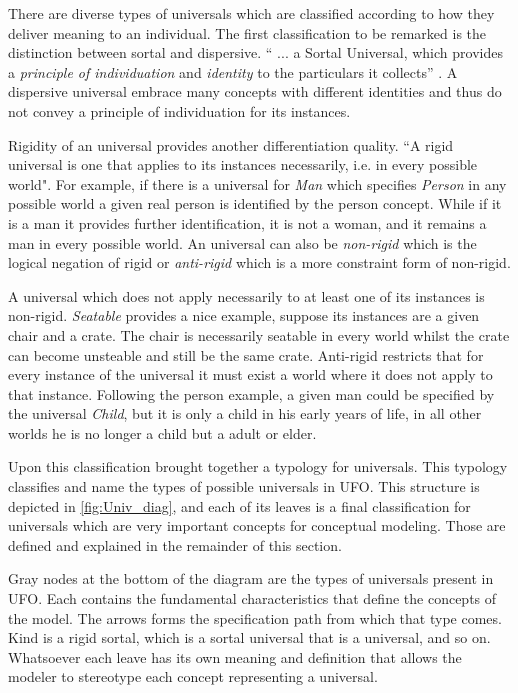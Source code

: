 There are diverse types of universals which are classified according to how they deliver meaning to an individual. The first classification to be remarked is the distinction between sortal and dispersive. `` ... a Sortal Universal, which provides a \textit{principle of individuation} and \textit{identity} to the particulars it collects'' \citep{guizzardi_ontological_2005}. A dispersive universal embrace many concepts with different identities and thus do not convey a principle of individuation for its instances.

Rigidity of an universal provides another differentiation quality. ``A rigid universal is one that applies to its instances necessarily, i.e. in every possible world"\citep{guizzardi_ontological_2005}. For example, if there is a universal for \textit{Man} which specifies \textit{Person} in any possible world a given real person is identified by the person concept. While if it is a man it provides further identification, it is not a woman, and it remains a man in every possible world. An universal can also be \textit{non-rigid} which is the logical negation of rigid or \textit{anti-rigid} which is a more constraint form of non-rigid.

A universal which does not apply necessarily to at least one of its instances is non-rigid. \textit{Seatable} provides a nice example, suppose its instances are a given chair and a crate. The chair is necessarily seatable in every world whilst the crate can become unsteable and still be the same crate. Anti-rigid restricts that for every instance of the universal it must exist a world where it does not apply to that instance. Following the person example, a given man could be specified by the universal \textit{Child}, but it is only a child in his early years of life, in all other worlds he is no longer a child but a adult or elder.

Upon this classification \citeauthor{guizzardi_ontological_2005} brought together a typology for universals. This typology classifies and name the types of possible universals in UFO. This structure is depicted in \autoref{fig:Univ_diag}, and each of its leaves is a final classification for universals which are very important concepts for conceptual modeling. Those are defined and explained in the remainder of this section.



Gray nodes at the bottom of the diagram are the types of universals present in UFO. Each contains the fundamental characteristics that define the concepts of the model. The arrows forms the specification path from which that type comes. Kind is a rigid sortal, which is a sortal universal that is a universal, and so on. Whatsoever each leave has its own meaning and definition that allows the modeler to stereotype each concept representing a universal.

